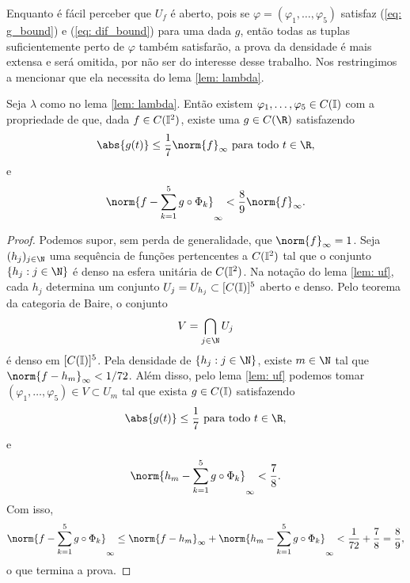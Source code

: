 Enquanto é fácil perceber que \( U_{ f } \) é aberto, pois se \( \varphi = ( \varphi_{ 1 }, \dots, \varphi_{ 5 } ) \) satisfaz (\ref{eq: g_bound}) e (\ref{eq: dif_bound}) para uma dada \( g \), então todas as tuplas suficientemente perto de \( \varphi \) também satisfarão, a prova da densidade é mais extensa e será omitida, por não ser do interesse desse trabalho.
Nos restringimos a mencionar que ela necessita do lema \ref{lem: lambda}.
\begin{lem}
    Seja \( \lambda \) como no lema \ref{lem: lambda}.
    Então existem \( \varphi_{ 1 }, \dots, \varphi_{ 5 } \in C(\mathbb{I}) \) com a propriedade de que, dada \( f \in C(\mathbb{I}^2) \), existe uma \( g \in C(\R) \) satisfazendo \[
        \abs{ g(t) } \leq \frac{ 1 }{ 7 } \norm{ f }_{ \infty } \text{ para todo } t \in \R
    ,\]
    e \[
        \norm{ 
            f - \sum_{ k=1 }^{ 5 } g \circ \Phi_{ k }
         }_{ \infty } < \frac{ 8 }{ 9 } \norm{ f }_{ \infty }
    .\]
    \label{lem: baire}
\end{lem}
\begin{proof}
    Podemos supor, sem perda de generalidade, que \( \norm{ f }_{ \infty } = 1 \).
    Seja \( (h_{ j })_{ j\in\N } \) uma sequência de funções pertencentes a \( C(\mathbb{I}^2) \) tal que o conjunto \( \left\{ h_{ j } : j\in \N \right\} \) é denso na esfera unitária de \( C(\mathbb{I}^2) \).
    Na notação do lema \ref{lem: uf}, cada \( h_{ j } \) determina um conjunto \( U_{ j } = U_{ h_{ j } } \subset  [C(\mathbb{I})]^{ 5 } \) aberto e denso.
    Pelo teorema da categoria de Baire, o conjunto \[
        V = \bigcap_{ j\in\N } U_{ j }
    \]
    é denso em \( [C(\mathbb{I})]^{ 5 } \).
    Pela densidade de \( \left\{ h_{ j } : j \in \N \right\} \), existe \( m \in \N \) tal que \( \norm{ f - h_{ m } }_{ \infty } < 1/72 \).
    Além disso, pelo lema \ref{lem: uf} podemos tomar \( ( \varphi_{ 1 }, \dots, \varphi_{ 5 } ) \in V \subset  U_{ m } \) tal que exista \( g \in C(\mathbb{I}) \) satisfazendo \[
        \abs{ g(t) } \leq \frac{ 1 }{ 7 } \text{ para todo } t \in \R
    ,\]
    e \[
        \norm{ 
            h_{ m } - \sum_{ k=1 }^{ 5 } g \circ \Phi_{ k }
         }_{ \infty } < \frac{ 7 }{ 8 }
    .\]
    Com isso, \[
        \norm{ 
            f - \sum_{ k=1 }^{ 5 } g \circ \Phi_{ k }
         }_{ \infty } \leq
        \norm{ f - h_{ m } }_{ \infty }
        + \norm{ 
            h_{ m } - \sum_{ k=1 }^{ 5 } g \circ \Phi_{ k }
         }_{ \infty }
         < \frac{ 1 }{ 72 } + \frac{ 7 }{ 8 }
         = \frac{ 8 }{ 9 }
    ,\]
    o que termina a prova.
\end{proof}
